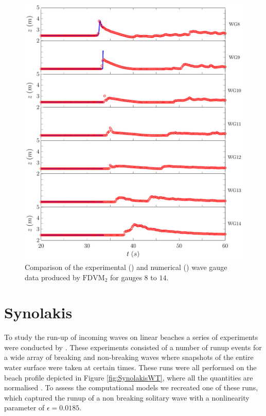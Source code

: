 \begin{figure}
	\centering
	\includegraphics[width=\textwidth]{./chp6/figures/Experiment/Roeber/Trial8/FDVM/LongWGs2.pdf}
	\caption{Comparison of the experimental () and numerical ({\color{blue}\solidrule}) wave gauge data produced by $\text{FDVM}_2$ for gauges $8$ to $14$.}
	\label{fig:Roeber8WG7to14FDVM}
\end{figure} 

\section{Synolakis}









To study the run-up of incoming waves on linear beaches a series of experiments were conducted by \citet{Synolakis-1987-523}. These experiments consisted of a number of runup events for a wide array of breaking and non-breaking waves where snapshots of the entire water surface were taken at certain times. These runs were all performed on the beach profile depicted in Figure \ref{fig:SynolakisWT}, where all the quantities are normalised \cite{Synolakis-1987-523}. To assess the computational models we recreated one of these runs, which captured the runup of a non breaking solitary wave with a nonlinearity parameter of $\epsilon = 0.0185$.

